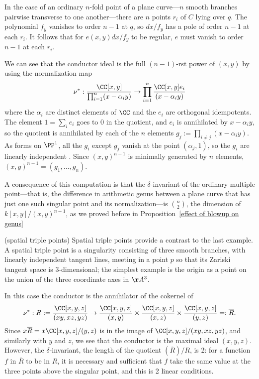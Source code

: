 \begin{example}
In the case of an ordinary $n$-fold point of a plane curve---$n$ smooth branches pairwise transverse to one another---there are $n$ points
$r_i$ of $C$ lying over $q$. The polynomial $f_y$ vanishes to order $n-1$ at $q$, so $dx/f_y$ has a pole of order $n-1$ at
each $r_i$. It follows that for $e(x,y)dx/f_y$ to be regular, $e$ must vanish to order $n-1$ at each $r_i$. 

We can see that the conductor ideal is the full $(n-1)$-rst power of $(x,y)$ by using the
normalization map
$$
\nu^{*}: \frac{\CC[x,y]}{\prod_{i=1}^{n} (x-\alpha_{i}y)} \to
 \prod_{i=1}^{n} \frac{\CC[x,y]e_{i}}{(x-\alpha_{i}y)}
$$
where the $\alpha_{i}$ are distinct elements of $\CC$ and the $e_{i}$ are orthogonal idempotents.
The element $1 = \sum_{i}e_{i}$ goes to 0 in the quotient, and $e_{i}$ is annihilated by $x-\alpha_{i}y$,
so the quotient is annihilated by each of the $n$ elements $g_{j} := \prod_{i\neq j} (x-\alpha_{i}y)$.
As forms on $\PP^{1}$, all the $g_{i}$ except $g_{j}$ vanish at the 
point $(\alpha_{j}, 1)$, so the $g_{i}$ are linearly independent . Since $(x,y)^{n-1}$ is minimally generated by $n$ elements, $(x,y)^{n-1} = (g_{1}, \dots, g_{n})$.

A consequence of this computation is that the $\delta$-invariant of the ordinary multiple point---that is, the difference in arithmetic genus between a plane curve that has just one such singular point and its normalization---is $\binom{n}{2}$, the dimension of $k[x,y]/(x,y)^{n-1}$, as we proved before in Proposition~\ref{effect of blowup on genus} \end{example}

\begin{example} (spatial triple points) Spatial triple points provide a contrast to the last example. A spatial triple point is a singularity consisting of three smooth branches, with linearly independent tangent lines, meeting in a point $p$ so that its Zariski tangent space is 3-dimensional; the simplest example is the origin as a point on the union of the three coordinate axes in $\AA^3$.

In this case the conductor is the annihilator of the cokernel of
$$
\nu^{*}: R := \frac{\CC[x,y,z]}{(xy, xz, yz)} \to \frac{\CC[x,y,z]}{(x,y)} \times \frac{\CC[x,y,z]}{(x,z)} \times \frac{\CC[x,y,z]}{(y,z)} =: \overline R.
$$
Since $x\overline {R} = x \CC[x,y,z]/(y,z)$ is in the image of $\CC[x,y,z]/(xy, xz, yz)$, and similarly with $y$ and $z$,
we see that the conductor is the maximal ideal $(x,y,z)$. However, the $\delta$-invariant, the length
of the quotient $(\overline R)/R$, is 2: for a function $f$ in $\overline R$ to be in $R$, it
is necessary and sufficient that $f$ take the same value at the three points above the singular point, 
and this is
2 linear conditions.
\end{example}

